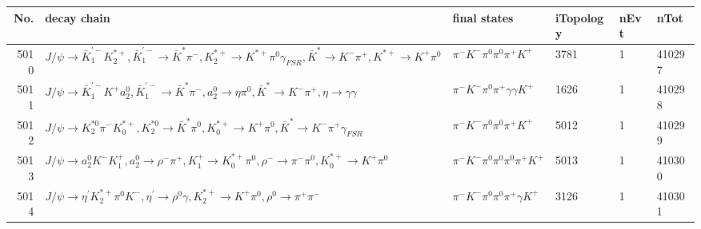 \begin{table}[htbp] 
\begin{center}
\begin{small}
\begin{tabular}{rlllll}\hline\hline
 No. & decay chain & final states &  iTopology & nEvt & nTot \\\hline
5010&$J/\psi       \rightarrow \bar{K}_1^{'-}K_2^{*+}       , \bar{K}_1^{'-} \rightarrow \bar{K}^{*}   \pi^{-}        , K_2^{*+}        \rightarrow K^{*+}         \pi^{0}        \gamma_{FSR} , \bar{K}^{*}    \rightarrow K^{-}          \pi^{+}        , K^{*+}          \rightarrow K^{+}          \pi^{0}        $&$\pi^{-}        K^{-}          \pi^{0}        \pi^{0}        \pi^{+}        K^{+}          $& 3781&    1&410297\\
5011&$J/\psi       \rightarrow \bar{K}_1^{'-}K^{+}          a_{2}^{0}      , \bar{K}_1^{'-} \rightarrow \bar{K}^{*}   \pi^{-}        , a_{2}^{0}       \rightarrow \eta          \pi^{0}        , \bar{K}^{*}    \rightarrow K^{-}          \pi^{+}        , \eta           \rightarrow \gamma       \gamma       $&$\pi^{-}        K^{-}          \pi^{0}        \pi^{+}        \gamma       \gamma       K^{+}          $& 1626&    1&410298\\
5012&$J/\psi       \rightarrow K_2^{*0}       \pi^{-}        K_{0}^{*+}     , K_2^{*0}        \rightarrow \bar{K}^{*}   \pi^{0}        , K_{0}^{*+}      \rightarrow K^{+}          \pi^{0}        , \bar{K}^{*}    \rightarrow K^{-}          \pi^{+}        \gamma_{FSR} $&$\pi^{-}        K^{-}          \pi^{0}        \pi^{0}        \pi^{+}        K^{+}          $& 5012&    1&410299\\
5013&$J/\psi       \rightarrow a_{2}^{0}      K^{-}          K_1^{+}        , a_{2}^{0}       \rightarrow \rho^{-}      \pi^{+}        , K_1^{+}         \rightarrow K_{0}^{*+}     \pi^{0}        , \rho^{-}       \rightarrow \pi^{-}        \pi^{0}        , K_{0}^{*+}      \rightarrow K^{+}          \pi^{0}        $&$\pi^{-}        K^{-}          \pi^{0}        \pi^{0}        \pi^{0}        \pi^{+}        K^{+}          $& 5013&    1&410300\\
5014&$J/\psi       \rightarrow \eta^{\prime} K_2^{*+}       \pi^{0}        K^{-}          , \eta^{\prime}  \rightarrow \rho^{0}      \gamma       , K_2^{*+}        \rightarrow K^{+}          \pi^{0}        , \rho^{0}       \rightarrow \pi^{+}        \pi^{-}        $&$\pi^{-}        K^{-}          \pi^{0}        \pi^{0}        \pi^{+}        \gamma       K^{+}          $& 3126&    1&410301\\

\end{tabular}
\end{small}
\end{center}
\end{table}
